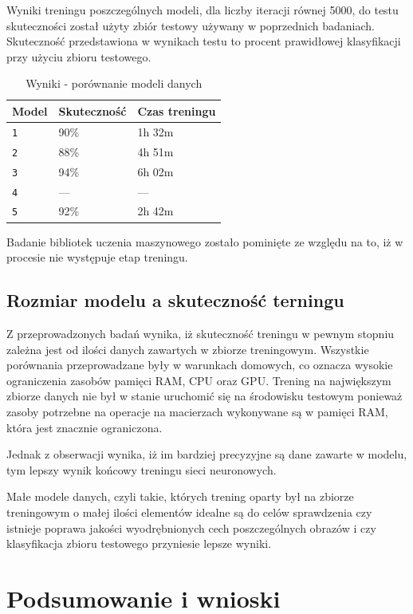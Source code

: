 \documentclass[brudnopis]{xmgr}
\begin{document}
Wyniki treningu poszczególnych modeli, dla liczby iteracji równej 5000, do testu skuteczności został użyty zbiór testowy używany w poprzednich badaniach. Skuteczność przedstawiona w wynikach testu to procent prawidłowej klasyfikacji przy użyciu zbioru testowego.

\begin{table}[!htb]
\begin{tabular}{|l|l|l|} \hline
Model & Skuteczność & Czas treningu  \\ \hline
\texttt 1 & 90\% & 1h 32m \\ \hline
\texttt 2 & 88\% & 4h 51m \\ \hline
\texttt 3 & 94\% & 6h 02m \\ \hline
\texttt 4 & --- & --- \\ \hline 
\texttt 5 & 92\% & 2h 42m \\ \hline
\end{tabular}
\caption{Wyniki - porównanie modeli danych}
\end{table}

Badanie bibliotek uczenia maszynowego zostało pominięte ze względu na to, iż w procesie nie występuje etap treningu.
\newpage

\section{Rozmiar modelu a skuteczność terningu}

Z przeprowadzonych badań wynika, iż skuteczność treningu w pewnym stopniu zależna jest od ilości danych zawartych w zbiorze treningowym. Wszystkie porównania przeprowadzane były w warunkach domowych, co oznacza wysokie ograniczenia zasobów pamięci RAM, CPU oraz GPU. Trening na największym zbiorze danych nie był w stanie uruchomić się na środowisku testowym ponieważ zasoby potrzebne na operacje na macierzach wykonywane są w pamięci RAM, która jest znacznie ograniczona. 

Jednak z obserwacji wynika, iż im bardziej precyzyjne są dane zawarte w modelu, tym lepszy wynik końcowy treningu sieci neuronowych.

Małe modele danych, czyli takie, których trening oparty był na zbiorze treningowym o małej ilości elementów idealne są do celów sprawdzenia czy istnieje poprawa jakości wyodrębnionych cech poszczególnych obrazów i czy klasyfikacja zbioru testowego przyniesie lepsze wyniki.

\chapter{Podsumowanie i wnioski}
\end{document}

